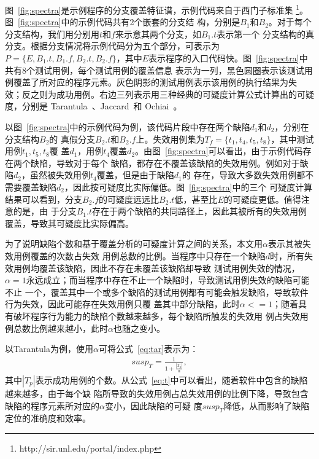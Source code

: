 图~\ref{fig:spectra}是示例程序的分支覆盖特征谱，示例代码来自于西门子标准集
\footnote{http://sir.unl.edu/portal/index.php}。图~\ref{fig:spectra}中的示例代码共有2个嵌套的分支结
构，分别是$B_1$和$B_2$。对于每个分支结构，我们用分别用$t$和$f$来示意其两个分支，如$B_1.t$表示第一个
分支结构的真分支。根据分支情况将示例代码分为五个部分，可表示为$P = \{E, B_1.t, B_1.f, B_2.t,
B_2.f\}$，其中$E$表示程序的入口代码快。图~\ref{fig:spectra}中共有8个测试用例，每个测试用例的覆盖信息
表示为一列，黑色圆圈表示该测试用例覆盖了所对应的程序元素。灰色阴影的测试用例表示该用例的执行结果为失
效；反之则为成功用例。右边三列表示用三种经典的可疑度计算公式计算出的可疑度，分别是
Tarantula~\cite{jones2005empirical}、Jaccard~\cite{abreu2007accuracy}和
Ochiai~\cite{abreu2007accuracy}。

以图~\ref{fig:spectra}中的示例代码为例，该代码片段中存在两个缺陷$d_1$和$d_2$，分别在分支结构$B_2$的
真假分支$B_2.t$和$B_2.f$上。失效用例集为$T_f=\{t_1, t_4, t_5, t_8\}$，其中测试用例$t_1, t_5, t_8$覆
盖$d_1$，用例$t_4$覆盖$d_2$。由图~\ref{fig:spectra}可以看出，由于示例代码存在两个缺陷，导致对于每个
缺陷，都存在不覆盖该缺陷的失效用例。例如对于缺陷$d_2$，虽然被失效用例$t_4$覆盖，但是由于缺陷$d_1$的
存在，导致大多数失效用例都不需要覆盖缺陷$d_2$，因此按可疑度比实际偏低。图~\ref{fig:spectra}中的三个
可疑度计算结果可以看到，分支$B_2.f$的可疑度远远比$B_2.t$低，甚至比$E$的可疑度更低。值得注意的是，由
于分支$B_1.t$存在于两个缺陷的共同路径上，因此其被所有的失效用例覆盖，导致其可疑度比实际偏高。

为了说明缺陷个数和基于覆盖分析的可疑度计算之间的关系，本文用$\alpha$表示其被失效用例覆盖的次数占失效
用例总数的比例。当程序中只存在一个缺陷$d$时，所有失效用例均覆盖该缺陷，因此不存在未覆盖该缺陷却导致
测试用例失效的情况，$\alpha=1$永远成立；而当程序中存在不止一个缺陷时，导致测试用例失效的缺陷可能不止
一个，覆盖其中一个或多个缺陷的测试用例都有可能会触发缺陷，导致软件行为失效，因此可能存在失效用例只覆
盖其中部分缺陷，此时$\alpha<=1$；随着具有破坏程序行为能力的缺陷个数越来越多，每个缺陷所触发的失效用
例占失效用例总数比例越来越小，此时$\alpha$也随之变小。

以Tarantula\cite{jones2005empirical}为例，使用$\alpha$可将公式~\ref{eq:tar}表示为：
\begin{eqnarray}
 susp_T = \frac{1}{1+\frac{|T_p|}{\alpha}}, \label{eq:t}
\end{eqnarray}
其中$|T_p|$表示成功用例的个数。从公式~\ref{eq:t}中可以看出，随着软件中包含的缺陷越来越多，由于每个缺
陷所导致的失效用例占总失效用例的比例下降，导致包含缺陷的程序元素所对应的$\alpha$变小，因此缺陷的可疑
度$susp_T$降低，从而影响了缺陷定位的准确度和效率。

